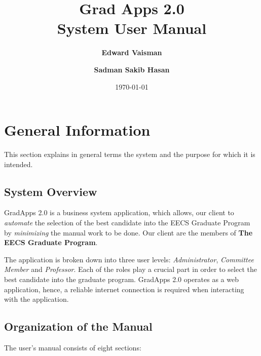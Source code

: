 \documentclass[fontsize=12pt,paper=letter,twoside]{scrartcl}
\author{\textbf{Edward Vaisman}
\and \textbf{Sadman Sakib Hasan}
}
\date{\today} %
\begin{document}
\title{Grad Apps 2.0 \\ System User Manual}
\maketitle

\newpage

\tableofcontents

\newpage



\section{General Information}
This section explains in general terms the system and the purpose for which it is
intended.

\subsection{System Overview}

GradApps 2.0 is a business system application, which allows, our client to \emph{automate} the selection of the best candidate into the EECS Graduate Program by \emph{minimizing} the manual work to be done. Our client are the members of \textbf{The EECS Graduate Program}.

\bigskip
\noindent The application is broken down into three user levels: \emph{Administrator}, \emph{Committee Member} and \emph{Professor}. Each of the roles play a crucial part in order to select the best candidate into the graduate program. GradApps 2.0 operates as a web application, hence, a reliable internet connection is required when interacting with the application.

\subsection{Organization of the Manual}
The user’s manual consists of eight sections:
\end{document}
